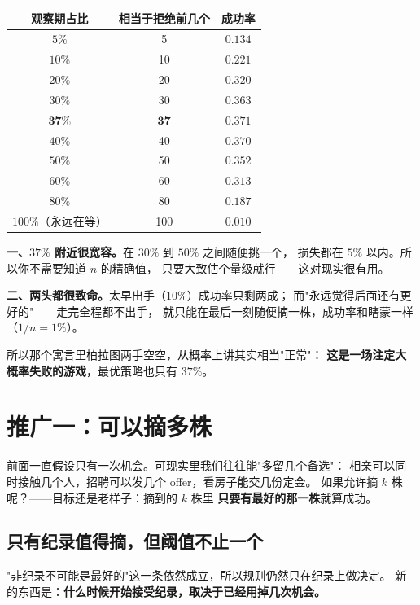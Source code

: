 \documentclass[UTF8,11pt,fontset=macnew]{ctexart}
\begin{document}
\begin{center}
\begin{tabular}{c c c}
\toprule
观察期占比 & 相当于拒绝前几个 & 成功率 \\
\midrule
$5\%$  & 5  & $0.134$ \\
$10\%$ & 10 & $0.221$ \\
$20\%$ & 20 & $0.320$ \\
$30\%$ & 30 & $0.363$ \\
$\mathbf{37\%}$ & $\mathbf{37}$ & $\mathbf{0.371}$ \\
$40\%$ & 40 & $0.370$ \\
$50\%$ & 50 & $0.352$ \\
$60\%$ & 60 & $0.313$ \\
$80\%$ & 80 & $0.187$ \\
$100\%$（永远在等）& 100 & $0.010$ \\
\bottomrule
\end{tabular}
\end{center}

\begin{keybox}[读这张表要读出来的两件事]
\textbf{一、$37\%$ 附近很宽容。}在 $30\%$ 到 $50\%$ 之间随便挑一个，
损失都在 $5\%$ 以内。所以你不需要知道 $n$ 的精确值，
只要大致估个量级就行——这对现实很有用。

\textbf{二、两头都很致命。}太早出手（$10\%$）成功率只剩两成；
而"永远觉得后面还有更好的"——走完全程都不出手，
就只能在最后一刻随便摘一株，成功率和瞎蒙一样（$1/n=1\%$）。

所以那个寓言里柏拉图两手空空，从概率上讲其实相当"正常"：
\textbf{这是一场注定大概率失败的游戏}，最优策略也只有 $37\%$。
\end{keybox}

\section{推广一：可以摘多株}
\label{sec:k}

前面一直假设只有一次机会。可现实里我们往往能"多留几个备选"：
相亲可以同时接触几个人，招聘可以发几个 offer，看房子能交几份定金。
如果允许摘 $k$ 株呢？——目标还是老样子：摘到的 $k$ 株里
\textbf{只要有最好的那一株}就算成功。

\subsection{只有纪录值得摘，但阈值不止一个}

"非纪录不可能是最好的"这一条依然成立，所以规则仍然只在纪录上做决定。
新的东西是：\textbf{什么时候开始接受纪录，取决于已经用掉几次机会。}
\end{document}
